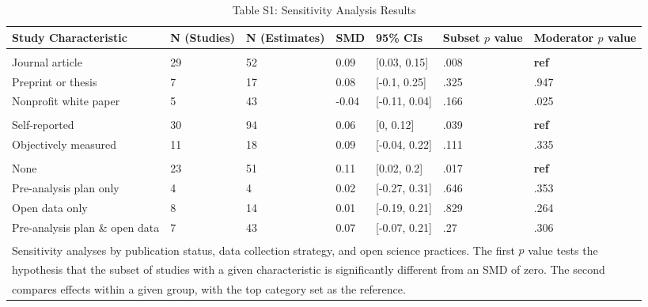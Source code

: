 \documentclass[sn-nature,referee,pdflatex]{sn-jnl}
\begin{document}
\captionsetup[table]{labelformat=empty}
\begin{table}[!ht]

\caption{\label{tab:table_S1}Table S1: Sensitivity Analysis Results}
\begin{tabular}[t]{lllll>{\raggedright\arraybackslash}p{2 cm}>{\raggedright\arraybackslash}p{2 cm}}
\toprule
Study Characteristic & N (Studies) & N (Estimates) & SMD & 95\% CIs & Subset $p$ value & Moderator $p$ value\\
\midrule
\addlinespace[0.3em]
\multicolumn{7}{l}{\textbf{Publication Status}}\\
\hspace{1em}Journal article & 29 & 52 & 0.09 & {}[0.03, 0.15] & .008 & \textbf{ref}\\
\hspace{1em}Preprint or thesis & 7 & 17 & 0.08 & {}[-0.1, 0.25] & .325 & .947\\
\hspace{1em}Nonprofit white paper & 5 & 43 & -0.04 & {}[-0.11, 0.04] & .166 & .025\\
\addlinespace[0.3em]
\multicolumn{7}{l}{\textbf{Data Collection Strategy}}\\
\hspace{1em}Self-reported & 30 & 94 & 0.06 & {}[0, 0.12] & .039 & \textbf{ref}\\
\hspace{1em}Objectively measured & 11 & 18 & 0.09 & {}[-0.04, 0.22] & .111 & .335\\
\addlinespace[0.3em]
\multicolumn{7}{l}{\textbf{Open Science}}\\
\hspace{1em}None & 23 & 51 & 0.11 & {}[0.02, 0.2] & .017 & \textbf{ref}\\
\hspace{1em}Pre-analysis plan only & 4 & 4 & 0.02 & {}[-0.27, 0.31] & .646 & .353\\
\hspace{1em}Open data only & 8 & 14 & 0.01 & {}[-0.19, 0.21] & .829 & .264\\
\hspace{1em}Pre-analysis plan \& open data & 7 & 43 & 0.07 & {}[-0.07, 0.21] & .27 & .306\\
\bottomrule
\multicolumn{7}{l}{\textsuperscript{} Sensitivity analyses by publication status, data collection strategy, and open science practices. The first $p$ value tests the}\\
\multicolumn{7}{l}{hypothesis that the subset of studies with a given characteristic is significantly different from an SMD of zero. The second}\\
\multicolumn{7}{l}{compares effects within a given group, with the top category set as the reference.}\\
\end{tabular}
\end{table}
\end{document}
